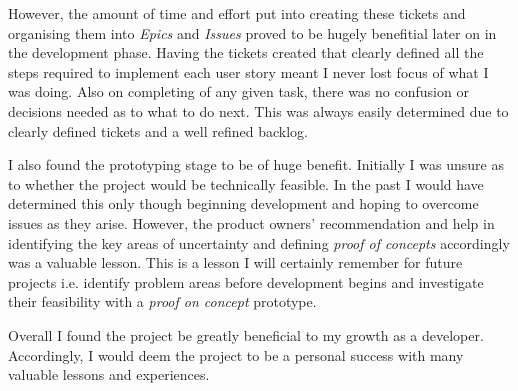   However, the amount of time and effort put into creating these tickets and organising them into \textit{Epics} and \textit{Issues} proved to be hugely benefitial later on in the development phase. Having the tickets created that clearly defined all the steps required to implement each user story meant I never lost focus of what I was doing. Also on completing of any given task, there was no confusion or decisions needed as to what to do next. This was always easily determined due to clearly defined tickets and a well refined backlog.
  
  I also found the prototyping stage to be of huge benefit. Initially I was unsure as to whether the project would be technically feasible. In the past I would have determined this only though beginning development and hoping to overcome issues as they arise. However, the product owners' recommendation and help in identifying the key areas of uncertainty and defining \textit{proof of concepts} accordingly was a valuable lesson. This is a lesson I will certainly remember for future projects i.e. identify problem areas before development begins and investigate their feasibility with a \textit{proof on concept} prototype.
  
  Overall I found the project be greatly beneficial to my growth as a developer. Accordingly, I would deem the project to be a personal success with many valuable lessons and experiences.
  
  
  
  